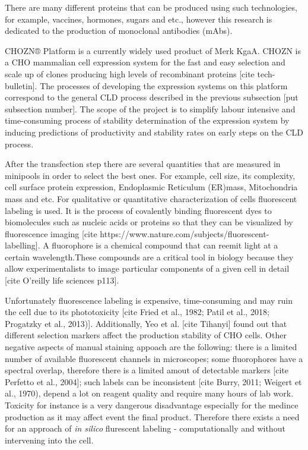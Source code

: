 There are many different proteins that can be produced using such technologies, for example, vaccines, hormones, sugars and etc., however this research is dedicated to the production of monoclonal antibodies (mAbs). 

CHOZN® Platform is a currently widely used product of Merk KgaA. CHOZN is a CHO mammalian cell expression system for the fast and easy selection and scale up of clones producing high levels of recombinant proteins [cite tech-bulletin]. The processes of developing the expression systems on this platform correspond to the general CLD process described in the previous subsection [put subsection number]. The scope of the project is to simplify labour intensive and time-consuming process of stability determination of the expression system by inducing predictions of productivity and stability rates on early steps on the CLD process. 

After the transfection step there are several quantities that are measured in minipools in order to select the best ones. For example, cell size, its complexity, cell surface protein expression, Endoplasmic Reticulum (ER)mass, Mitochondria mass and etc. For qualitative or quantitative characterization of cells fluorescent labeling is used. It is the process of covalently binding fluorescent dyes to biomolecules such as nucleic acids or proteins so that they can be visualized by fluorescence imaging [cite https://www.nature.com/subjects/fluorescent-labelling]. A fluorophore is a chemical compound that can reemit light at a certain wavelength.These compounds are a critical tool in biology because they allow experimentalists to image particular components of a given cell in detail [cite O'reilly life sciences p113].

Unfortunately fluorescence labeling is expensive, time-consuming and may ruin the cell due to its phototoxicity [cite Fried et al., 1982; Patil et al., 2018; Progatzky et al., 2013)]. Additionally, Yeo et al. [cite Tihanyi] found out that different selection markers affect the production stability of CHO cells. Other negative aspects of manual staining appoach are the following: there is a limited number of available fluorescent channels in microscopes; some fluorophores have a spectral overlap, therefore there is a limited amout of detectable markers [cite Perfetto et al., 2004]; such labels can be inconsistent [cite Burry, 2011; Weigert et al., 1970), depend a lot on reagent quality and require many hours of lab work. Toxicity for instance is a very dangerous disadvantage especially for the medince production as it may affect event the final product. Therefore there exists a need for an approach of \textit{in silico} flurescent labeling - computationally and without intervening into the cell. 

